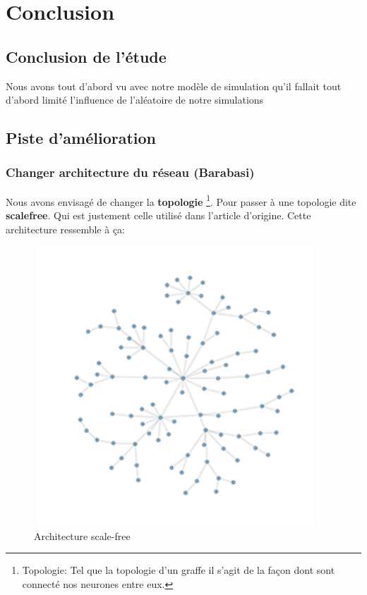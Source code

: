 \hypertarget{conclusion}{%
\chapter{Conclusion}\label{conclusion}}

\section{Conclusion de l'étude}

Nous avons tout d'abord vu avec notre modèle de simulation qu'il fallait tout d'abord limité l'influence de l'aléatoire de notre simulations

\section{Piste d'amélioration}

\subsection{Changer architecture du réseau (Barabasi)}
Nous avons envisagé de changer la \textbf{topologie} \footnote{Topologie: Tel que la topologie d'un graffe il s'agit de la façon dont sont connecté nos neurones entre eux.}. Pour passer à une topologie dite \textbf{scalefree}. Qui est justement celle utilisé dans l'article d'origine. Cette architecture ressemble à ça:

\begin{figure}[h!]
\begin{center}
\includegraphics[width=10.5cm,height=10.5cm]{./images/scalefree.png}
\end{center}
\caption{Architecture scale-free}
\label{scale_free}
\end{figure}
